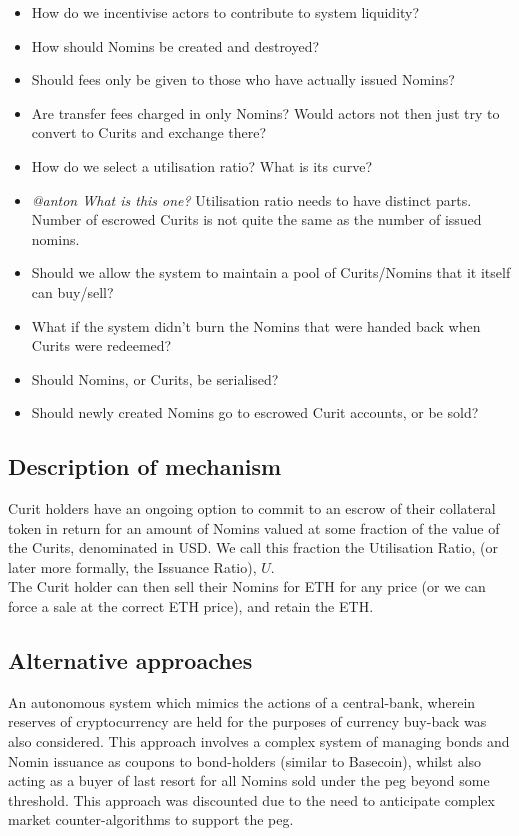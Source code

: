 \documentclass{article}
\begin{document}
\begin{itemize}
    \item How do we incentivise actors to contribute to system liquidity?
    \item How should Nomins be created and destroyed?
    \item Should fees only be given to those who have actually issued Nomins?
    \item Are transfer fees charged in only Nomins? Would actors not then just try to convert to Curits and exchange there?
    \item How do we select a utilisation ratio? What is its curve?
    \item \textit{@anton What is this one?} Utilisation ratio needs to have distinct parts. Number of escrowed Curits is not quite the same as the number of issued nomins.
    \item Should we allow the system to maintain a pool of Curits/Nomins that it itself can buy/sell?
    \item What if the system didn't burn the Nomins that were handed back when Curits were redeemed?
    \item Should Nomins, or Curits, be serialised?
    \item Should newly created Nomins go to escrowed Curit accounts, or be sold?
\end{itemize}

\subsection{Description of mechanism}

Curit holders have an ongoing option to commit to an escrow of their collateral token in return for an amount of Nomins valued at some fraction of the value of the Curits, denominated in USD. We call this fraction the Utilisation Ratio, (or later more formally, the Issuance Ratio), $ U $. \\

\noindent The Curit holder can then sell their Nomins for ETH for any price (or we can force a sale at the correct ETH price), and retain the ETH.


\subsection{Alternative approaches}

\noindent An autonomous system which mimics the actions of a central-bank, wherein reserves of cryptocurrency are held for the purposes of currency buy-back was also considered. This approach involves a complex system of managing bonds and Nomin issuance as coupons to bond-holders (similar to Basecoin), whilst also acting as a buyer of last resort for all Nomins sold under the peg beyond some threshold. This approach was discounted due to the need to anticipate complex market counter-algorithms to support the peg. \\
\end{document}
